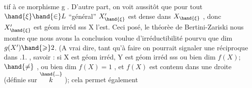 tif à ce morphisme  g . D'autre part, on voit aussitôt que pour tout
$\hand{\xi}\hand{\in} L$  ``général''  $X'_{\hand{\xi}}$ est dense dans $X_{\hand{\xi}}$ , donc  $X'_{\hand{\xi}}$  est géom irréd sss
X  l'est.  Ceci posé,  le théorèe de Bertini-Zariski nous montre que
nous avons la conclusion voulue  d'irréductibilité pourvu que
dim $g(X') \hand{\geqslant} 2$. (A vrai dire, tant qu'à faire on pourrait signaler une
réciproque dans .1. , savoir :  si X est géom irréd, Y  est
géom irréd sss  ou bien  dim $f(X)$; $\hand{\neq}$ , ou bien  dim $f(X)=1$ , et $f(X)$
est contenu dans une droite (définie sur $\overset{\hand{\rule{0.6em}{0.35pt}}}{k}$ )\hand{)}; cela permet également


